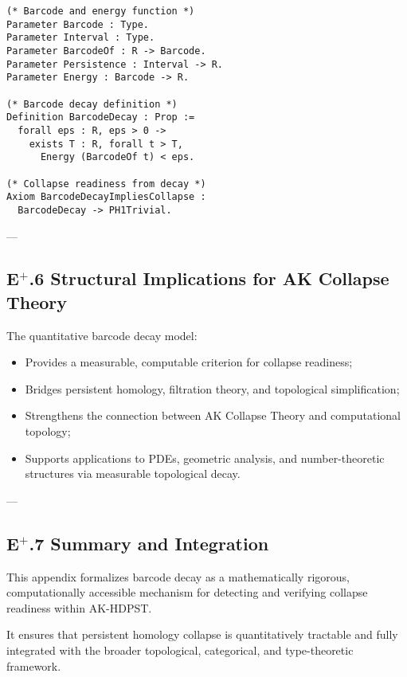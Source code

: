 \documentclass[11pt]{article}
\begin{document}
\begin{lstlisting}[language=Coq]
(* Barcode and energy function *)
Parameter Barcode : Type.
Parameter Interval : Type.
Parameter BarcodeOf : R -> Barcode.
Parameter Persistence : Interval -> R.
Parameter Energy : Barcode -> R.

(* Barcode decay definition *)
Definition BarcodeDecay : Prop :=
  forall eps : R, eps > 0 ->
    exists T : R, forall t > T,
      Energy (BarcodeOf t) < eps.

(* Collapse readiness from decay *)
Axiom BarcodeDecayImpliesCollapse :
  BarcodeDecay -> PH1Trivial.
\end{lstlisting}

---

\subsection*{E$^{+}$.6 Structural Implications for AK Collapse Theory}

The quantitative barcode decay model:

\begin{itemize}
    \item Provides a measurable, computable criterion for collapse readiness;
    \item Bridges persistent homology, filtration theory, and topological simplification;
    \item Strengthens the connection between AK Collapse Theory and computational topology;
    \item Supports applications to PDEs, geometric analysis, and number-theoretic structures via measurable topological decay.
\end{itemize}

---

\subsection*{E$^{+}$.7 Summary and Integration}

This appendix formalizes barcode decay as a mathematically rigorous, computationally accessible mechanism for detecting and verifying collapse readiness within AK-HDPST.

It ensures that persistent homology collapse is quantitatively tractable and fully integrated with the broader topological, categorical, and type-theoretic framework.



\end{document}
